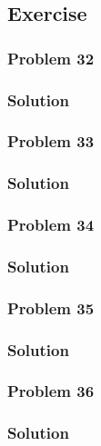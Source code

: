 \documentclass[journal,12pt,twocolumn]{IEEEtran}
\begin{document}
\subsection{Exercise}
\subsubsection{Problem 32}

%
\subsubsection{Solution}


\subsubsection{Problem 33}

%
\subsubsection{Solution}


\subsubsection{Problem 34}

%
\subsubsection{Solution}


\subsubsection{Problem 35}

%
\subsubsection{Solution}


\subsubsection{Problem 36}

%
\subsubsection{Solution}

\end{document}
